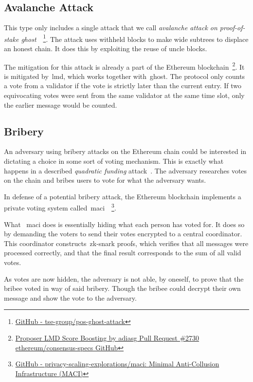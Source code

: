 \subsection{Avalanche Attack}\label{subsec:avalanche-attack}
This type only includes a single attack that we call \textit{avalanche attack on proof-of-stake ghost}~\cite{10.1145/3560829.3563560}~\footnote{
\href{https://github.com/tse-group/pos-ghost-attack?tab=readme-ov-file}{GitHub - tse-group/pos-ghost-attack}}.
The attack uses withheld blocks to make wide subtrees to displace an honest chain.
It does this by exploiting the reuse of uncle blocks.

The mitigation for this attack is already a part of the Ethereum blockchain~\footnote{\href{https://github.com/ethereum/consensus-specs/pull/2730}{Proposer LMD Score
Boosting by adiasg Pull Request \#2730 ethereum/consensus-specs GitHub}}.
It is mitigated by~\gls{lmd}, which works together with~\gls{ghost}.
The protocol only counts a vote from a validator if the vote is strictly later than the current entry.
If two equivocating votes were sent from the same validator at the same time slot,
only the earlier message would be counted.

\subsection{Bribery}\label{subsec:bribery}
An adversary using bribery attacks on the Ethereum chain could be interested
in dictating a choice in some sort of voting mechanism.
This is exactly what happens in a described \textit{quadratic funding} attack~\cite{EthereumAttacks2024}.
The adversary researches votes on the chain and bribes users to vote for what the adversary wants.

In defense of a potential bribery attack,
the Ethereum blockchain implements a private voting system called~\gls{maci}~\cite{EthereumAttacks2024,MACI2022}~\footnote{
\href{https://github.com/privacy-scaling-explorations/maci}{GitHub -
privacy-scaling-explorations/maci: Minimal Anti-Collusion Infrastructure (MACI)}}.

What ~\gls{maci} does is essentially hiding what each person has voted for.
It does so by demanding the voters to send their votes encrypted to a central coordinator.
This coordinator constructs~\gls{zk-snark} proofs, which verifies that all messages were processed correctly,
and that the final result corresponds to the sum of all valid votes.

As votes are now hidden, the adversary is not able, by oneself, to prove that the bribee voted in way of said bribery.
Though the bribee could decrypt their own message and show the vote to the adversary.

